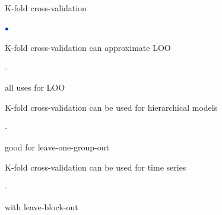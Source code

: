 \documentclass[english,t]{beamer}
\newenvironment{list1}{
   \begin{list}{$\color{list1}\bullet$}{\itemsep=6pt}}{
  \end{list}}
\newenvironment{list2}{
  \begin{list}{-}{\baselineskip=12pt\itemsep=2pt}}{
  \end{list}}
\begin{document}
\begin{frame}{}
  
{\Large\color{navyblue} K-fold cross-validation}

\begin{list1}
\item K-fold cross-validation can approximate LOO
  \begin{list2}
    \item all uses for LOO
  \end{list2}
\item K-fold cross-validation can be used for hierarchical models
  \begin{list2}
    \item good for leave-one-group-out
  \end{list2}
\item K-fold cross-validation can be used for time series
  \begin{list2}
    \item with leave-block-out
  \end{list2}
\end{list1}

\end{frame}
\end{document}
